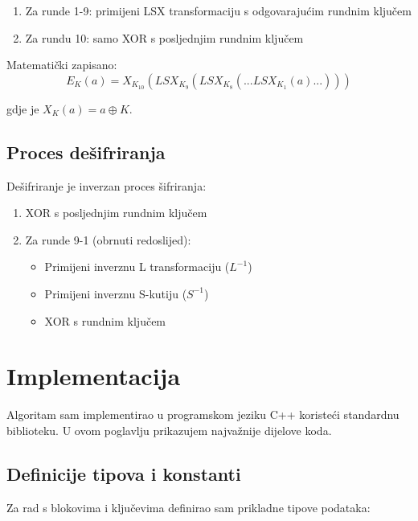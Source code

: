 \documentclass[12pt,a4paper]{article}
\begin{document}
\begin{enumerate}
    \item Za runde 1-9: primijeni LSX transformaciju s odgovarajućim rundnim ključem
    \item Za rundu 10: samo XOR s posljednjim rundnim ključem
\end{enumerate}

Matematički zapisano:
\begin{equation}
    E_K(a) = X_{K_{10}}(LSX_{K_9}(LSX_{K_8}(...LSX_{K_1}(a)...)))
\end{equation}

gdje je $X_K(a) = a \oplus K$.

\subsection{Proces dešifriranja}

Dešifriranje je inverzan proces šifriranja:

\begin{enumerate}
    \item XOR s posljednjim rundnim ključem
    \item Za runde 9-1 (obrnuti redoslijed):
    \begin{itemize}
        \item Primijeni inverznu L transformaciju ($L^{-1}$)
        \item Primijeni inverznu S-kutiju ($S^{-1}$)
        \item XOR s rundnim ključem
    \end{itemize}
\end{enumerate}

\newpage
\section{Implementacija}

Algoritam sam implementirao u programskom jeziku C++ koristeći standardnu biblioteku. U ovom poglavlju prikazujem najvažnije dijelove koda.

\subsection{Definicije tipova i konstanti}

Za rad s blokovima i ključevima definirao sam prikladne tipove podataka:
\end{document}
